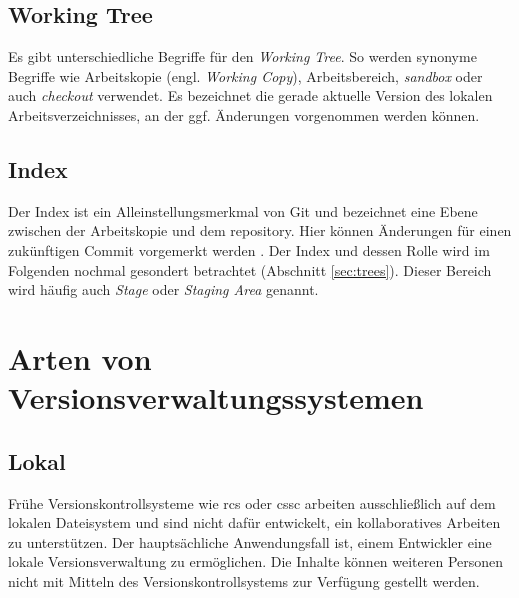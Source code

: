 \subsection{Working Tree}\label{sec:workingtree} Es gibt unterschiedliche
Begriffe für den \textit{Working Tree}. So werden synonyme Begriffe wie
Arbeitskopie (engl. \textit{Working Copy}), Arbeitsbereich, \textit{sandbox}
oder auch \textit{checkout} verwendet. Es bezeichnet die gerade aktuelle
Version des lokalen Arbeitsverzeichnisses, an der ggf.  Änderungen vorgenommen
werden können. \cite[S.~20]{gitosp}

\subsection{Index}\label{sec:index}
Der Index ist ein Alleinstellungsmerkmal von Git und bezeichnet eine Ebene
zwischen der Arbeitskopie und dem \gls{repository}. Hier können Änderungen für
einen zukünftigen Commit vorgemerkt werden \cite[S.~20]{gitosp}. Der Index und
dessen Rolle wird im Folgenden nochmal gesondert betrachtet (Abschnitt
\ref{sec:trees}). Dieser Bereich wird häufig auch \textit{Stage} oder
\textit{Staging Area} genannt\cite[S.~11]{progit}.

\section{Arten von Versionsverwaltungssystemen}
\subsection{Lokal}\label{sec:local}
Frühe Versionskontrollsysteme wie \acrshort{rcs} oder \acrshort{cssc} arbeiten
ausschließlich auf dem lokalen Dateisystem und sind nicht dafür entwickelt, ein
kollaboratives Arbeiten zu unterstützen. Der hauptsächliche Anwendungsfall ist,
einem Entwickler eine lokale Versionsverwaltung zu ermöglichen. Die Inhalte
können weiteren Personen nicht mit Mitteln des Versionskontrollsystems zur
Verfügung gestellt werden.

